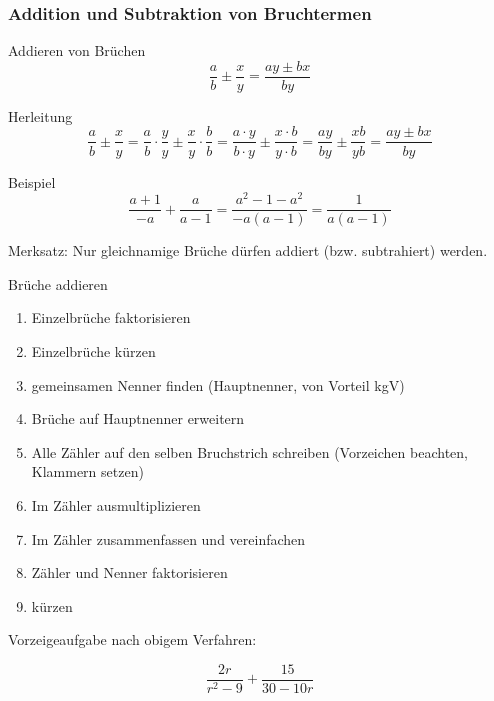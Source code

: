 \subsubsection{Addition und Subtraktion von Bruchtermen}

\begin{gesetz}{Addieren von Brüchen}{}
$$\frac{a}{b}\pm\frac{x}{y} = \frac{ay\pm{}bx}{by}$$
\end{gesetz}

Herleitung
$$\frac{a}{b}\pm\frac{x}{y} = \frac{a}{b}\cdot\frac{y}{y} \pm \frac{x}{y}\cdot\frac{b}{b} =
\frac{a\cdot y}{b\cdot y}\pm \frac{x\cdot b}{y \cdot b} = \frac{ay}{by}\pm\frac{xb}{yb} = \frac{ay\pm{}bx}{by}$$

Beispiel
$$\frac{a+1}{-a} + \frac{a}{a-1} = \frac{a^2 - 1 - a^2}{-a(a-1)} = \frac{1}{a(a-1)}$$

Merksatz: Nur gleichnamige Brüche dürfen addiert (bzw. subtrahiert)
werden.

\begin{rezept}{Brüche addieren}{}
\begin{enumerate}
	\item Einzelbrüche faktorisieren
	\item Einzelbrüche kürzen
	\item gemeinsamen Nenner finden (Hauptnenner, von Vorteil kgV)
	\item Brüche auf Hauptnenner erweitern
	\item Alle Zähler auf den selben Bruchstrich schreiben (Vorzeichen beachten, Klammern setzen)
	\item Im Zähler ausmultiplizieren
	\item Im Zähler zusammenfassen und vereinfachen
	\item Zähler und Nenner faktorisieren
	\item kürzen
\end{enumerate}
\end{rezept}
\newpage

Vorzeigeaufgabe nach obigem Verfahren:

$$\frac{2r}{r^2-9} + \frac{15}{30-10r}$$

